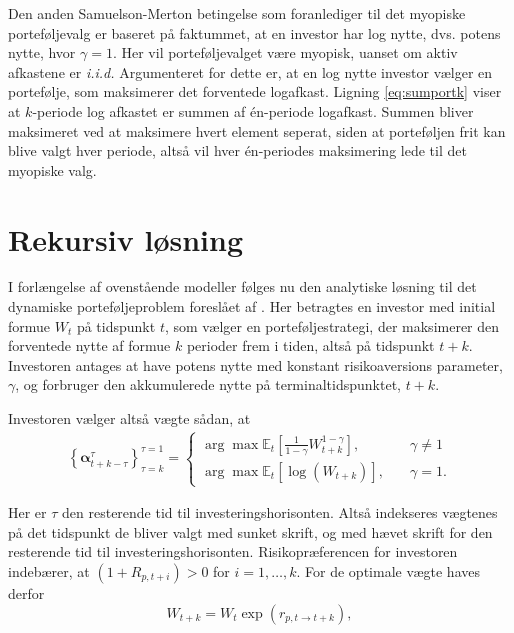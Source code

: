 \documentclass[
  a4paper,
  oneside]{memoir}
\begin{document}
Den anden Samuelson-Merton betingelse som foranlediger til det myopiske porteføljevalg er baseret på faktummet, at en investor har log nytte, dvs. potens nytte, hvor \(\gamma=1\). Her vil porteføljevalget være myopisk, uanset om aktiv afkastene er \emph{i.i.d.} Argumenteret for dette er, at en log nytte investor vælger en portefølje, som maksimerer det forventede logafkast. Ligning \eqref{eq:sumportk} viser at \(k\)-periode log afkastet er summen af én-periode logafkast. Summen bliver maksimeret ved at maksimere hvert element seperat, siden at porteføljen frit kan blive valgt hver periode, altså vil hver én-periodes maksimering lede til det myopiske valg.

\hypertarget{rekloes}{%
\section{Rekursiv løsning}\label{rekloes}}

I forlængelse af ovenstående modeller følges nu den analytiske løsning til det dynamiske porteføljeproblem foreslået af \citep{JurVic2011}. Her betragtes en investor med initial formue \(W_t\) på tidspunkt \(t\), som vælger en porteføljestrategi, der maksimerer den forventede nytte af formue \(k\) perioder frem i tiden, altså på tidspunkt \(t+k\). Investoren antages at have potens nytte med konstant risikoaversions parameter, \(\gamma\), og forbruger den akkumulerede nytte på terminaltidspunktet, \(t+k\).

Investoren vælger altså vægte sådan, at
\begin{align}
\left\{\bm{\alpha}_{t+k-\tau}^\tau\right\}_{\tau=k}^{\tau=1}=
\begin{cases}
\arg\max\mathbb{E}_t\left[\frac{1}{1-\gamma}W_{t+k}^{1-\gamma}\right],\quad &\gamma\neq 1\\
\arg\max\mathbb{E}_t\left[\log(W_{t+k})\right],\quad &\gamma=1.
\end{cases}\label{eq:jurvaegt}
\end{align}

Her er \(\tau\) den resterende tid til investeringshorisonten. Altså indekseres vægtenes på det tidspunkt de bliver valgt med sunket skrift, og med hævet skrift for den resterende tid til investeringshorisonten. Risikopræferencen for investoren indebærer, at \((1+R_{p,t+i})>0\) for \(i=1,\dots,k\). For de optimale vægte haves derfor
\begin{equation}
W_{t+k}=W_t\exp(r_{p,t\to t+k}),\label{eq:formuetk}
\end{equation}
\end{document}
